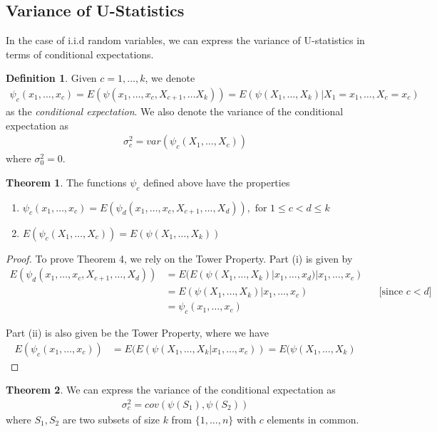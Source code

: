 \documentclass{article}
\theoremstyle{definition}
\newtheorem{theorem}{Theorem}
\newtheorem{Def}{Definition}
\numberwithin{Def}{section}
\begin{document}
\subsection{Variance of U-Statistics}
In the case of i.i.d random variables, we can express the variance of U-statistics in terms of conditional expectations. 

\begin{Def}
Given $c = 1, \dotsc, k$, we denote \begin{align}
    \psi_c(x_1, \dotsc, x_c) = E(\psi(x_1, \dotsc, x_c, X_{c+1}, \dotsc X_k)) = E(\psi(X_1, \dotsc, X_k)|X_1 = x_1, \dotsc, X_c = x_c)
\end{align}
as the \textit{conditional expectation}. We also denote the variance of the conditional expectation as 
\begin{align}
    \sigma_c^2 = var(\psi_c(X_1, \dotsc, X_c))
\end{align}
where $\sigma_0^2 = 0$. 
\end{Def}

\begin{theorem}\label{cond_exp}
The functions $\psi_c$ defined above have the properties
        \begin{enumerate}[label = (\roman*)]
            \item $\psi_c(x_1, \dotsc, x_c) = E(\psi_d(x_1, \dotsc, x_c, X_{c+1}, \dotsc, X_d)), \text{ for } 1 \leq c <d \leq k$
            \item $E(\psi_c(X_1, \dotsc, X_c)) = E(\psi(X_1, \dotsc, X_k))$
        \end{enumerate}
\end{theorem}
\begin{proof}
To prove Theorem 4, we rely on the Tower Property. Part (i) is given by 
\begin{align*}
 E(\psi_d(x_1, \dotsc, x_c, X_{c+1}, \dotsc, X_d)) &= E(E(\psi(X_1, \dotsc, X_k)|x_1, \dotsc, x_d)|x_1, \dotsc, x_c)  \\
 &= E(\psi(X_1, \dotsc, X_k)|x_1, \dotsc, x_c)  &&\text{[since $c<d$]}\\
 &=\psi_c(x_1, \dotsc, x_c)
\end{align*}

Part (ii) is also given be the Tower Property, where we have 
\begin{align*}
    E(\psi_c(x_1, \dotsc, x_c)) &= E(E(\psi(X_1, \dotsc, X_k|x_1, \dotsc, x_c)) = E(\psi(X_1, \dotsc, X_k)
\end{align*}
\end{proof}

\begin{theorem}
We can express the variance of the conditional expectation as \begin{align}
    \sigma_c^2 = cov(\psi(S_1), \psi(S_2))
\end{align}
where $S_1, S_2$ are two subsets of size $k$ from $\{1, \dotsc, n\}$ with $c$ elements in common. 
\end{theorem}
\end{document}
